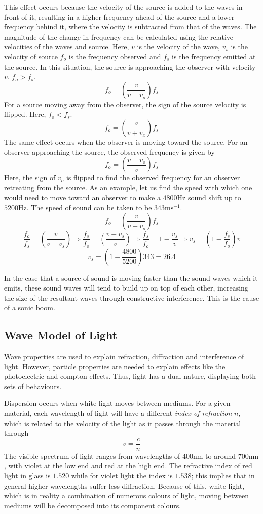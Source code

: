 \documentclass[12pt]{report}
\begin{document}
\begin{flushleft}
\bigskip
This effect occurs because the velocity of the source is added to the waves in
front of it, resulting in a higher frequency ahead of the source and a lower
frequency behind it, where the velocity is subtracted from that of the waves.
The magnitude of the change in frequency can be calculated using the relative 
velocities of the waves and source. Here, \(v\) is the velocity of the wave,
\(v_s\) is the velocity of source \(f_o\) is the frequency observed and \(f_s\)
is the frequency emitted at the source. In this situation, the source is 
approaching the observer with velocity \(v\). \(f_o > f_s\).
\[f_o = \left(\frac{v}{v - v_s}\right)f_s\]
For a source moving away from the observer, the sign of the source velocity
is flipped. Here, \(f_o < f_s\).
\[f_o = \left(\frac{v}{v + v_x}\right)f_s\]
The same effect occurs when the observer is moving toward the source. For an
observer approaching the source, the observed frequency is given by
\[f_o = \left(\frac{v + v_o}{v}\right)f_s\]
Here, the sign of \(v_o\) is flipped to find the observed frequency for an
observer retreating from the source. As an example, let us find the speed with
which one would need to move toward an observer to make a \(4800\mathrm{Hz}\)
sound shift up to \(5200\mathrm{Hz}\). The speed of sound can be taken to be
\(343\mathrm{ms}^{-1}\).
\[f_o = \left(\frac{v}{v - v_s}\right)f_s\]
\[\frac{f_o}{f_s} = \left(\frac{v}{v - v_s}\right) \Rightarrow 
\frac{f_s}{f_o} = \left(\frac{v - v_s}{v}\right) \Rightarrow
\frac{f_s}{f_o} = 1 - \frac{v_s}{v} \Rightarrow 
v_s = \left(1 - \frac{f_s}{f_o}\right)v\]
\[v_s = \left(1 - \frac{4800}{5200}\right)343 = 26.4\]

In the case that a source of sound is moving faster than the sound waves which
it emits, these sound waves will tend to build up on top of each other, 
increasing the size of the resultant waves through constructive interference.
This is the cause of a sonic boom.

\subsection*{Wave Model of Light}
Wave properties are used to explain refraction, diffraction and interference of 
light. However, particle properties are needed to explain effects like the 
photoelectric and compton effects. Thus, light has a dual nature, displaying
both sets of behaviours.

\bigskip
Dispersion occurs when white light moves between mediums. For a given material,
each wavelength of light will have a different \textit{index of refraction} 
\(n\), which is related to the velocity of the light as it passes through the 
material through
\[v = \frac{c}{n}\]
The visible spectrum of light ranges from wavelengths of \(400\mathrm{nm}\) to
around \(700\mathrm{nm}\), with violet at the low end and red at the high end.
The refractive index of red light in glass is \(1.520\) while for violet light
the index is \(1.538\); this implies that in general higher wavelengths suffer
less diffraction. Because of this, white light, which is in reality a
combination of numerous colours of light, moving between mediums will be 
decomposed into its component colours.


\end{flushleft}
\end{document}
